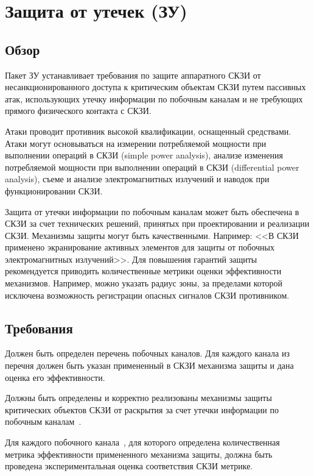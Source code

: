 \section{Защита от утечек (ЗУ)}\label{NI}

\subsection{Обзор}\label{NI.Intro}

Пакет ЗУ устанавливает требования по защите аппаратного СКЗИ от несанкционированного 
доступа к критическим объектам СКЗИ путем пассивных атак, использующих утечку 
информации по побочным каналам и не требующих прямого физического контакта с 
СКЗИ. 

Атаки проводит противник высокой квалификации, оснащенный 
 средствами. Атаки могут основываться на измерении 
потребляемой  мощности при выполнении операций в СКЗИ (simple power analysis), 
анализе изменения потребляемой мощности при выполнении операций в СКЗИ 
(differential power analysis), съеме и анализе электромагнитных излучений и 
наводок при функционировании СКЗИ.

Защита от утечки информации по побочным каналам может быть обеспечена в СКЗИ за 
счет технических решений, принятых при проектировании и реализации СКЗИ. 
%
Механизмы защиты могут быть качественными. Например: 
<<В СКЗИ применено экранирование активных элементов для защиты от побочных 
электромагнитных излучений>>. 
%
Для повышения гарантий защиты рекомендуется приводить количественные метрики 
оценки эффективности механизмов. Например, можно указать радиус зоны, 
за пределами которой исключена возможность регистрации опасных сигналов 
СКЗИ противником.

\subsection{Требования}\label{NI.Reqs}


\label{R.NI.Channels}
Должен быть определен перечень побочных каналов. Для каждого канала из перечня
должен быть указан примененный в СКЗИ механизма защиты и дана оценка его
эффективности.
                             	

\label{R.NI.Protect}
Должны быть определены и корректно реализованы механизмы защиты критических 
объектов СКЗИ от раскрытия за счет утечки информации по побочным 
каналам~. 


\label{R.NI.Estimate}
Для каждого побочного канала~, для которого определена 
количественная метрика эффективности примененного механизма защиты, 
должна быть проведена экспериментальная оценка соответствия СКЗИ 
метрике.

